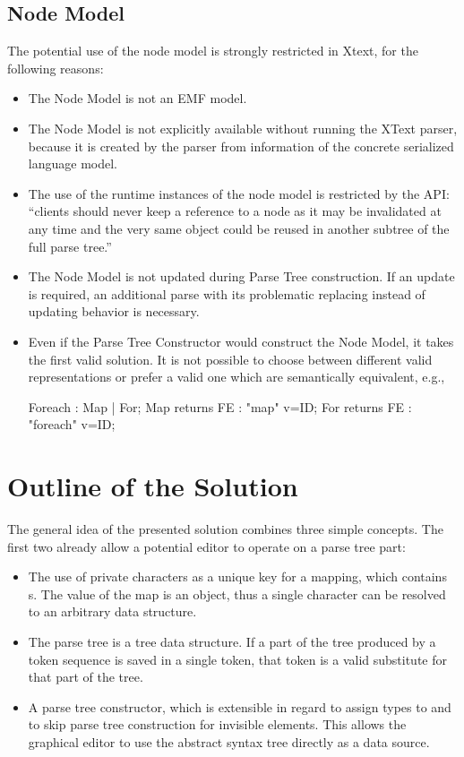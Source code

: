 \subsection{Node Model}
The potential use of the node model is strongly restricted in Xtext, for the following reasons:
\begin{itemize}
	\item The Node Model is not an EMF model. 
	\item The Node Model is not explicitly available without running the XText parser, because it is created by the parser from information of the concrete serialized language model. 
	\item The use of the runtime instances of the node model is restricted by the API: ``clients should never keep a reference to a node as it may be invalidated at any time and the very same object could be reused in another subtree of the full parse tree.''\cite{XTextAPI}
	\item The Node Model is not updated during Parse Tree construction. If an update is required, an additional parse with its problematic replacing instead of updating behavior is necessary.
	\item Even if the Parse Tree Constructor would construct the Node Model, it takes the first valid solution. It is not possible to choose between different valid representations or prefer a valid one which are semantically equivalent, e.g.,
\begin{xtxt}
Foreach 		: 	Map | For;
Map returns FE  	:  	"map" 		v=ID;
For returns FE  	: 	"foreach"	v=ID;
\end{xtxt}
\end{itemize}


\section{Outline of the Solution}
The general idea of the presented solution combines three simple concepts. The first two already allow a potential editor to operate on a parse tree part:
\begin{itemize}
	\item The use of private characters as a unique key for a mapping, which contains s. The value of the map is an object, thus a single character can be resolved to an arbitrary data structure.
	\item The parse tree is a tree data structure. If a part of the tree produced by a token sequence is saved in a single token, that token is a valid substitute for that part of the tree.
	\item A parse tree constructor, which is extensible in regard to assign types to and to skip parse tree construction for invisible elements. This allows the graphical editor to use the abstract syntax tree directly as a data source. 
\end{itemize}

